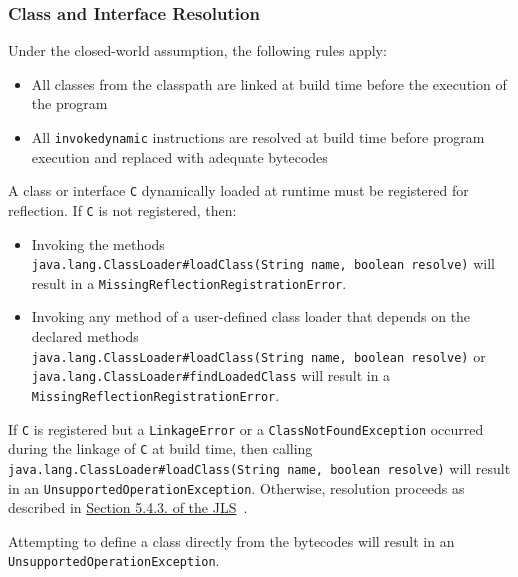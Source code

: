 \subsubsection{Class and Interface Resolution}
Under the closed-world assumption, the following rules apply: 
\begin{itemize}
    \item All classes from the classpath are linked at build time before the execution of the program  
    \item All \texttt{invokedynamic} instructions are resolved at build time before program execution and replaced with adequate bytecodes
\end{itemize}

A class or interface \verb|C| dynamically loaded at runtime must be registered for reflection. If \verb|C| is not registered, then: 
\begin{itemize}
    \item Invoking the methods \texttt{java.lang.ClassLoader\#loadClass(String\ name,\ boolean\ resolve)} will result in a \texttt{MissingReflectionRegistrationError}. 
    \item Invoking any method of a user-defined class loader that depends on the declared methods \texttt{java.lang.ClassLoader\#loadClass(String\ name,\ boolean\ resolve)} or \texttt{java.lang.ClassLoader\#findLoadedClass} will result in a \texttt{MissingReflectionRegistrationError}.
\end{itemize}

If \verb|C| is registered but a \texttt{LinkageError} or a \texttt{ClassNotFoundException} occurred during the linkage of \verb|C| at build time, then calling \texttt{java.lang.ClassLoader\#loadClass(String\ name,\ boolean\ resolve)} will result in an \texttt{UnsupportedOperationException}. Otherwise, resolution proceeds as described in \href{https://docs.oracle.com/javase/specs/jvms/se21/html/jvms-5.html\#jvms-5.4.3}{Section
5.4.3. of the JLS}~\cite{noauthor_java_nodate-2}.

Attempting to define a class directly from the bytecodes will result in an \texttt{UnsupportedOperationException}.

